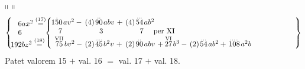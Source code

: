 \pend%
\vspace{0.40em}%
%
\pstart%
$\shortparallel$%
\hspace{122mm}%
$\shortparallel$
\pend%
\vspace{0.35em}%
%
\pstart%
\noindent%
\[%
\left%
\{%
\setlength{\tabcolsep}{0.5pt}%
\begin{tabular}{l}
\hspace{-0,8mm}%
$\phantom{19}6ax^2 \stackrel{(17)}{=} $%
\\
\hspace{-0,8mm}%
\phantom{19}6%
\\
\hspace{-0,8mm}%
$192bz^2\stackrel{(18)}{=}$%
\\%
\end{tabular}%
\right .%
\hspace{-1,5mm}%
\left \{%
\setlength{\tabcolsep}{1.8pt}%
\begin{tabular}{llllll}%
\hspace{-0,9mm}%
$\stackrel{.}{150}\!av^2 \:-$
&
$(4)\!\stackrel{..}{90}\!abv \ +$
&
$(4)\!\stackrel{...}{54}\!ab^2$%
& & &
\\
\hspace{-1,0mm}%
\phantom{15}7
&
\phantom{(4)\,9}3
&
\phantom{(4)\,5}7
\quad
per XI%
& & &
\\
\hspace{-2,0mm}%
$\phantom{1}\stackrel{\text{VII}}{75}\!bv^2 \:-$
&
$(2)\!\stackrel{....}{45}\!b^2v \ +$
&
$(2)\!\stackrel{..}{90}\!abv \ +$
&
\hspace{-6,0mm}%
$\stackrel{\text{VI}}{27}\!b^3 \:-$
&
$(2)\!\stackrel{...}{54}\!ab^2 \: +$
&
$\stackrel{.....}{108}\!a^2b$%
\\%
\end{tabular}%
\hspace{20,0mm}%
\right%
\}\]%
%
\pend%
\vspace{-0.5em}%
%
\pstart%
\noindent%
Patet valorem 15 $+$ val. 16 $=$ val. 17 $+$ val. 18.%
\protect{}%
%
%
%
%
